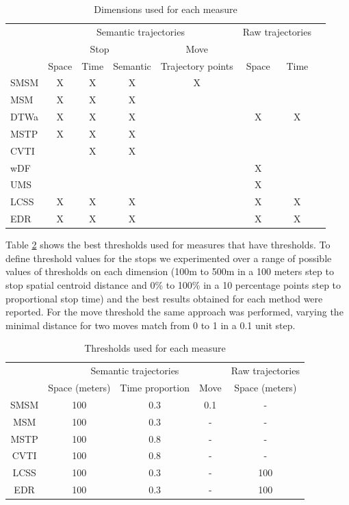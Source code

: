 \documentclass[12pt]{article}
\begin{document}
\begin{table}[!h]
\scriptsize
  \centering
  \begin{tabular}{|l|c|c|c|c|c|c|c|}
  	\hline
  & \multicolumn{4}{c|}{Semantic trajectories} & \multicolumn{2}{c|}{Raw trajectories} \\
 	\cline{2-5}
  & \multicolumn{3}{c|}{Stop} & \multicolumn{1}{c|}{Move} & \multicolumn{2}{c|}{} \\
 	\cline{2-7}
  & Space & Time & Semantic & Trajectory points & Space & Time\\
  	\hline
 SMSM & X & X & X & X & & \\
 MSM & X & X & X & & & \\
 DTWa & X & X & X & & X & X \\
 MSTP & X & X & X & & & \\
 CVTI & & X & X & & & \\
 wDF & & & & & X & \\
 UMS & & & & & X & \\
 LCSS & X & X & X & & X & X \\
 EDR & X & X & X & & X & X \\
    \hline
  \end{tabular}
  \caption{Dimensions used for each measure}
  \label{tab:san_francisco_measures}
\end{table}

Table \ref{tab:san_francisco_thresholds} shows the best thresholds used for measures that have thresholds. To define threshold values for the stops we experimented over a range of possible values of thresholds on each dimension (100m to 500m in a 100 meters step to stop spatial centroid distance and 0\% to 100\% in a 10 percentage points step to proportional stop time) and the best results obtained for each method were reported. For the move threshold the same approach was performed, varying the minimal distance for two moves match from 0 to 1 in a 0.1 unit step.

\begin{table}[!h]
\scriptsize
  \centering
  \begin{tabular}{|c|c|c|c|c|}
  	\hline
  & \multicolumn{3}{c|}{Semantic trajectories} & \multicolumn{1}{c|}{Raw trajectories} \\
 	\cline{2-5}
  & Space (meters) & Time proportion & Move & Space (meters) \\
  	\hline
 SMSM & 100 & 0.3 & 0.1 & - \\
 MSM & 100 & 0.3 & - & - \\
 MSTP & 100 & 0.8 & - & -  \\
 CVTI & 100 & 0.8 & - & -  \\
 LCSS & 100 & 0.3 & - & 100 \\
 EDR & 100 & 0.3 & - & 100 \\
    \hline
  \end{tabular}
  \caption{Thresholds used for each measure}
  \label{tab:san_francisco_thresholds}
\end{table}
\end{document}
